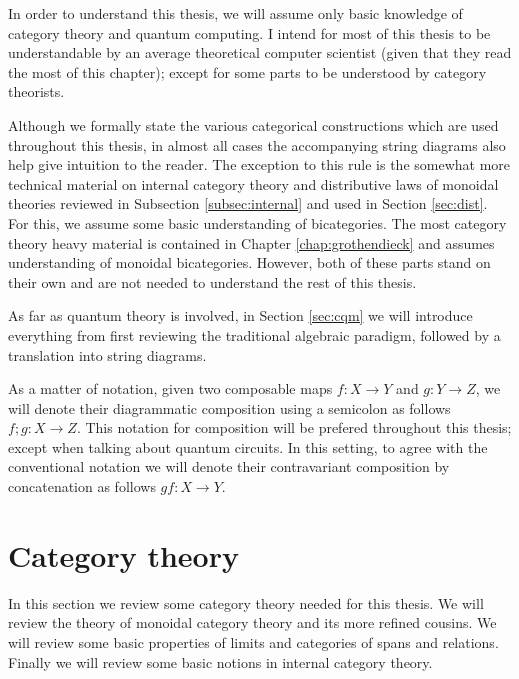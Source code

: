 In order to understand this thesis, we will assume only basic knowledge of category theory and quantum computing.  I intend for most of this thesis to be understandable by an average theoretical computer scientist  (given that they read the most of this chapter); except for some parts to be understood by category theorists.


Although we formally state the various categorical constructions which are used throughout this thesis, in almost all cases the accompanying string diagrams also help give intuition to the reader.  The exception to this rule is the somewhat more technical  material on internal category theory and distributive laws of monoidal theories reviewed in Subsection \ref{subsec:internal} and used in Section \ref{sec:dist}.  For this, we assume some basic understanding of bicategories.  The most category theory heavy material is contained in Chapter \ref{chap:grothendieck} and assumes understanding of monoidal bicategories.  However, both of these parts stand on their own and are not needed to understand the rest of this thesis.

As far as quantum theory is involved, in Section \ref{sec:cqm} we will introduce everything from first reviewing the traditional algebraic paradigm, followed by a translation into string diagrams.

As a matter of notation, given two composable maps $f:X\to Y$ and $g:Y \to Z$, we will denote their diagrammatic composition using a semicolon as follows $f;g:X\to Z$. This notation for composition will be prefered throughout this thesis; except when talking about quantum circuits.  In this setting, to agree with the conventional notation we will denote their contravariant composition by concatenation as follows $gf:X\to Y$.



\section{Category theory}
\label{sec:cat}

In this section we review some category theory needed for this thesis. We will review the theory of monoidal category theory and its more refined cousins. We will review some basic properties of limits and categories of spans and relations.  Finally we will review some basic notions in internal category theory.





